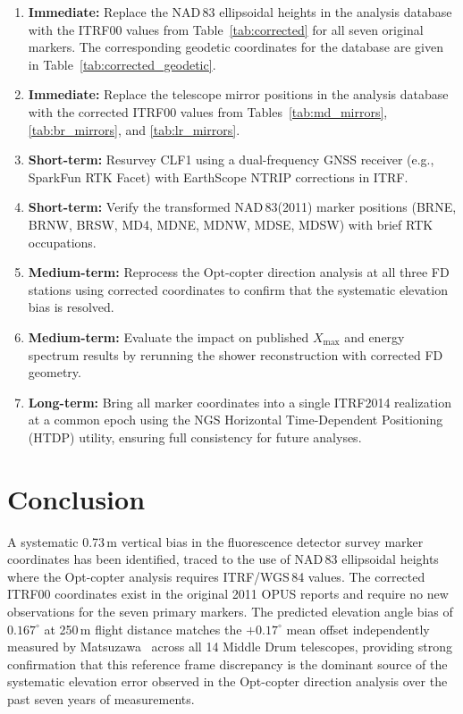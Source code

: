 \documentclass[11pt,letterpaper]{article}
\newcommand{\degree}{^\circ}
\newcommand{\Xmax}{X_{\text{max}}}
\begin{document}
\begin{enumerate}[nosep]
\item \textbf{Immediate:} Replace the NAD\,83 ellipsoidal heights in the analysis database with the ITRF00 values from Table~\ref{tab:corrected} for all seven original markers. The corresponding geodetic coordinates for the database are given in Table~\ref{tab:corrected_geodetic}.

\item \textbf{Immediate:} Replace the telescope mirror positions in the analysis database with the corrected ITRF00 values from Tables~\ref{tab:md_mirrors}, \ref{tab:br_mirrors}, and \ref{tab:lr_mirrors}.

\item \textbf{Short-term:} Resurvey CLF1 using a dual-frequency GNSS receiver (e.g., SparkFun RTK Facet) with EarthScope NTRIP corrections in ITRF.

\item \textbf{Short-term:} Verify the transformed NAD\,83(2011) marker positions (BRNE, BRNW, BRSW, MD4, MDNE, MDNW, MDSE, MDSW) with brief RTK occupations.

\item \textbf{Medium-term:} Reprocess the Opt-copter direction analysis at all three FD stations using corrected coordinates to confirm that the systematic elevation bias is resolved.

\item \textbf{Medium-term:} Evaluate the impact on published $\Xmax$ and energy spectrum results by rerunning the shower reconstruction with corrected FD geometry.

\item \textbf{Long-term:} Bring all marker coordinates into a single ITRF2014 realization at a common epoch using the NGS Horizontal Time-Dependent Positioning (HTDP) utility, ensuring full consistency for future analyses.
\end{enumerate}

\section{Conclusion}

A systematic 0.73\,m vertical bias in the fluorescence detector survey marker coordinates has been identified, traced to the use of NAD\,83 ellipsoidal heights where the Opt-copter analysis requires ITRF/WGS\,84 values. The corrected ITRF00 coordinates exist in the original 2011 OPUS reports and require no new observations for the seven primary markers. The predicted elevation angle bias of $0.167\degree$ at 250\,m flight distance matches the $+0.17\degree$ mean offset independently measured by Matsuzawa~\cite{matsuzawa2025} across all 14 Middle Drum telescopes, providing strong confirmation that this reference frame discrepancy is the dominant source of the systematic elevation error observed in the Opt-copter direction analysis over the past seven years of measurements.
\end{document}
